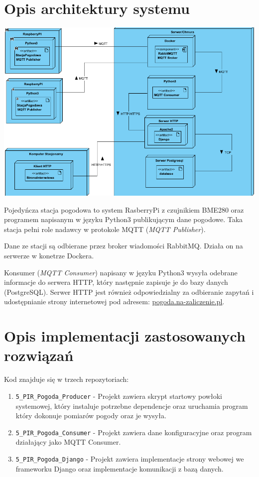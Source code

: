 \documentclass[12pt,a4paper]{article}
\begin{document}
    \pagebreak
    \section{Opis architektury systemu}

    \noindent
    \includegraphics*[scale=0.5]{architektura.png}

    \vspace*{3mm}

    Pojedyńcza stacja pogodowa to system RasberryPi z czujnikiem BME280 oraz programem napisanym w języku Python3 publikującym dane pogodowe. Taka stacja pełni role nadawcy w protokole MQTT (\emph{MQTT Publisher}).

    Dane ze stacji są odbierane przez broker wiadomości RabbitMQ. Działa on na serwerze w konetrze Dockera.

    Konsumer (\emph{MQTT Consumer}) napisany w języku Python3 wysyła odebrane informacje do serwera HTTP, który następnie zapisuje je do bazy danych (PostgreSQL). Serwer HTTP jest również odpowiedzialny za odbieranie zapytań i udostępnianie strony internetowej pod adresem: \href{http://pogoda.na-zaliczenie.pl}{pogoda.na-zaliczenie.pl}.

    \pagebreak
    \section{Opis implementacji zastosowanych rozwiązań}
    Kod znajduje się w trzech repozytoriach:
    \begin{enumerate}
        \item \texttt{5\_PIR\_Pogoda\_Producer} - Projekt zawiera skrypt startowy powłoki systemowej, który instaluje potrzebne dependencje oraz uruchamia program który dokonuje pomiarów pogody oraz je wysyła.
        \item \texttt{5\_PIR\_Pogoda\_Consumer} - Projekt zawiera dane konfiguracyjne oraz program działający jako MQTT Consumer.
        \item \texttt{5\_PIR\_Pogoda\_Django} - Projekt zawiera implementacje strony webowej we frameworku Django oraz implementacje komunikacji z bazą danych.
    \end{enumerate}
\end{document}
